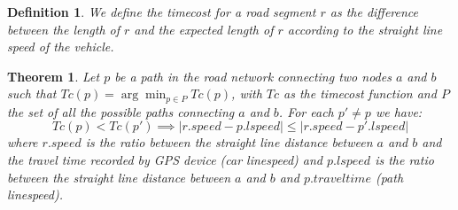 \documentclass[5p]{elsarticle}
\newtheorem{definition}{Definition}
\newtheorem{theorem}{Theorem}
\begin{document}
\begin{definition}
We define the \emph{timecost} for a road segment $r$ as the difference between the length of $r$ and the expected length of $r$ according to the straight line speed of the vehicle.
\end{definition}

\begin{theorem}

Let $p$ be a path in the road network connecting two nodes $a$ and $b$ such that $Tc(p) = \arg\min_{p \in P } Tc(p)$, with $Tc$ as the timecost function and $P$ the set of all the possible paths connecting $a$ and $b$. For
each $p' \neq p$ we have:
\begin{displaymath} 
Tc(p)<Tc(p') \implies |r.speed-p.lspeed| \leq |r.speed-p'.lspeed|
\end{displaymath}
where $r.speed$ is the ratio between the straight line distance between $a$ and $b$ and the travel time recorded by GPS device (car linespeed)
 and $p.lspeed$ is the ratio between the straight line distance between $a$ and $b$ and $p.traveltime$ (path linespeed).
\end{theorem}
\end{document}
